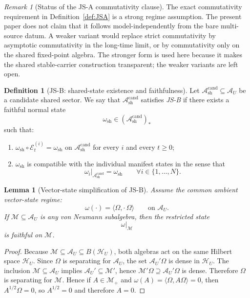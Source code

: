 \documentclass[12pt]{article}
\newtheorem{lemma}[theorem]{Lemma}
\theoremstyle{definition}
\newtheorem{definition}[theorem]{Definition}
\theoremstyle{remark}
\newtheorem{remark}[theorem]{Remark}
\begin{document}
\begin{remark}[Status of the JS-A commutativity clause]
The exact commutativity requirement in Definition~\ref{def:JSA} is a
strong regime assumption. The present paper does not claim that it
follows model-independently from the bare multi-source datum. A weaker
variant would replace strict commutativity by asymptotic commutativity
in the long-time limit, or by commutativity only on the shared
fixed-point algebra. The stronger form is used here because it makes the
shared stable-carrier construction transparent; the weaker variants are
left open.
\end{remark}

\begin{definition}[JS-B: shared-state existence and faithfulness]
\label{def:JSB}
Let \(\mathcal A_{\mathrm{sh}}^{\mathrm{cand}}\subseteq \mathcal A_U\)
be a candidate shared sector. We say that \(\mathcal A_{\mathrm{sh}}^{\mathrm{cand}}\)
satisfies \emph{JS-B} if there exists a faithful normal state
\[
\omega_{\mathrm{sh}}
\in
(\mathcal A_{\mathrm{sh}}^{\mathrm{cand}})_*
\]
such that:
\begin{enumerate}
\item \(\omega_{\mathrm{sh}}\circ\mathcal E_t^{(i)}=\omega_{\mathrm{sh}}\)
  on \(\mathcal A_{\mathrm{sh}}^{\mathrm{cand}}\) for every
  \(i\) and every \(t\ge 0\);
\item \(\omega_{\mathrm{sh}}\) is compatible with the individual
  manifest states in the sense that
  \[
  \omega_i|_{\mathcal A_{\mathrm{sh}}^{\mathrm{cand}}}
  =
  \omega_{\mathrm{sh}}
  \qquad
  \forall i\in\{1,\dots,N\}.
  \]
\end{enumerate}
\end{definition}

\begin{lemma}[Vector-state simplification of JS-B]\label{lem:vectorJSB}
Assume the common ambient vector-state regime:
\[
\omega(\cdot)=\langle\Omega,\cdot\,\Omega\rangle
\qquad
\text{on } \mathcal A_U.
\]
If \(\mathcal M\subseteq \mathcal A_U\) is any von Neumann subalgebra,
then the restricted state
\[
\omega|_{\mathcal M}
\]
is faithful on \(\mathcal M\).
\end{lemma}

\begin{proof}
Because \(\mathcal M\subseteq \mathcal A_U\subseteq B(\mathcal H_U)\),
both algebras act on the same Hilbert space \(\mathcal H_U\). Since
\(\Omega\) is separating for \(\mathcal A_U\), the set
\(\mathcal A_U'\Omega\) is dense in \(\mathcal H_U\). The inclusion
\(\mathcal M\subseteq \mathcal A_U\) implies \(\mathcal A_U'\subseteq
\mathcal M'\), hence \(\mathcal M'\Omega\supseteq \mathcal A_U'\Omega\)
is dense. Therefore \(\Omega\) is separating for \(\mathcal M\).
Hence if \(A\in\mathcal M_+\) and
\(\omega(A)=\langle\Omega,A\Omega\rangle=0\), then
\(A^{1/2}\Omega=0\), so \(A^{1/2}=0\) and therefore \(A=0\).
\end{proof}
\end{document}
